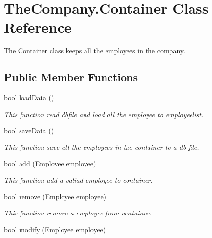 \hypertarget{class_the_company_1_1_container}{\section{The\-Company.\-Container Class Reference}
\label{class_the_company_1_1_container}
}


The \hyperlink{class_the_company_1_1_container}{Container} class keeps all the employees in the company.  


\subsection*{Public Member Functions}
\begin{DoxyCompactItemize}
\item 
bool \hyperlink{class_the_company_1_1_container_afc057ed3a9764d876c11d501912bf107}{load\-Data} ()
\begin{DoxyCompactList}\small\item\em This function read dbfile and load all the employee to employeelist. \end{DoxyCompactList}\item 
bool \hyperlink{class_the_company_1_1_container_a112c52144a5767df15b96d58bcc7482e}{save\-Data} ()
\begin{DoxyCompactList}\small\item\em This function save all the employees in the container to a db file. \end{DoxyCompactList}\item 
bool \hyperlink{class_the_company_1_1_container_a2e99d2eb72d53b3327ecc94ec2fa463b}{add} (\hyperlink{class_all_employees_1_1_employee}{Employee} employee)
\begin{DoxyCompactList}\small\item\em This function add a valiad employee to container. \end{DoxyCompactList}\item 
bool \hyperlink{class_the_company_1_1_container_a0868a215e36122b268859bed3b4f182f}{remove} (\hyperlink{class_all_employees_1_1_employee}{Employee} employee)
\begin{DoxyCompactList}\small\item\em This function remove a employee from container. \end{DoxyCompactList}\item 
bool \hyperlink{class_the_company_1_1_container_aa5bf9dd742c1f1f828cf8428e9e8141d}{modify} (\hyperlink{class_all_employees_1_1_employee}{Employee} employee)

\end{DoxyCompactItemize}

